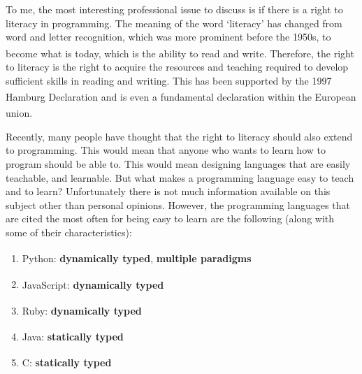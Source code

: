 \documentclass[]{full}
\theoremstyle{definition}
\begin{document}
To me, the most interesting professional issue to discuss is if there is a right to literacy in programming. The meaning of the word `literacy' has changed from word and letter recognition, which was more prominent before the 1950s, to become what is today, which is the ability to read and write\textsuperscript{\cite{gee_1991}}. Therefore, the right to literacy is the right to acquire the resources and teaching required to develop sufficient skills in reading and writing. This has been supported by the 1997 Hamburg Declaration\textsuperscript{\cite{hamburg_1997}} and is even a fundamental declaration within the European union\textsuperscript{\cite{edrl_2016}}.

Recently, many people have thought that the right to literacy should also extend to programming. This would mean that anyone who wants to learn how to program should be able to. This would mean designing languages that are easily teachable, and learnable. But what makes a programming language easy to teach and to learn? Unfortunately there is not much information available on this subject other than personal opinions. However, the programming languages that are cited the most often for being easy to learn are the following (along with some of their characteristics):

\begin{enumerate}
    \item Python: \textbf{dynamically typed}, \textbf{multiple paradigms}\textsuperscript{\cite{5_easiest_and_hardest_programming_languages_to_learn}}\textsuperscript{\cite{6_easiest_programming_languages_to_learn}}\textsuperscript{\cite{deery_2021}}
    \item JavaScript: \textbf{dynamically typed}\textsuperscript{\cite{5_easiest_and_hardest_programming_languages_to_learn}}\textsuperscript{\cite{6_easiest_programming_languages_to_learn}}\textsuperscript{\cite{deery_2021}}
    \item Ruby: \textbf{dynamically typed}\textsuperscript{\cite{6_easiest_programming_languages_to_learn}}\textsuperscript{\cite{deery_2021}}
    \item Java: \textbf{statically typed}\textsuperscript{\cite{5_easiest_and_hardest_programming_languages_to_learn}}\textsuperscript{\cite{6_easiest_programming_languages_to_learn}}
    \item C: \textbf{statically typed}\textsuperscript{\cite{5_easiest_and_hardest_programming_languages_to_learn}}\textsuperscript{\cite{6_easiest_programming_languages_to_learn}}
\end{enumerate}
\end{document}
